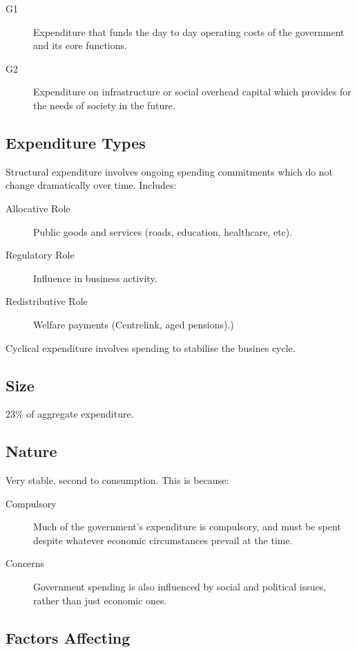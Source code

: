 \documentclass[a4paper,11pt]{report}
\begin{document}
\begin{description}
\item [G1] Expenditure that funds the day to day operating costs of the
	government and its core functions.
\item [G2] Expenditure on infrastructure or social overhead capital which
	provides for the needs of society in the future.
\end{description}

\subsection{Expenditure Types}

Structural expenditure involves ongoing spending commitments which do not
change dramatically over time. Includes:

\begin{description}
\item [Allocative Role] Public goods and services (roads, education, healthcare,
	etc).
\item [Regulatory Role] Influence in business activity.
\item [Redistributive Role] Welfare payments (Centrelink, aged pensions).)
\end{description}

Cyclical expenditure involves spending to stabilise the busines cycle.

\subsection{Size}

23\% of aggregate expenditure.

\subsection{Nature}

Very stable, second to consumption. This is because:

\begin{description}
\item [Compulsory] Much of the government's expenditure is compulsory, and must
	be spent despite whatever economic circumstances prevail at the time.
\item [Concerns] Government spending is also influenced by social and political
	issues, rather than just economic ones.
\end{description}

\subsection{Factors Affecting}
\end{document}
